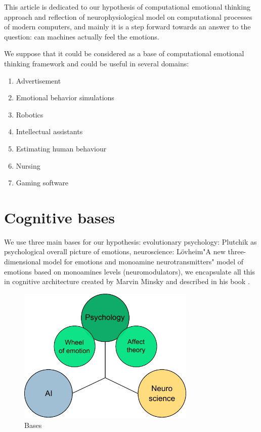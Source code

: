 This article is dedicated to our hypothesis of computational emotional thinking approach and reflection of neurophysiological model on computational processes of modern computers, and mainly it is a step forward towards an answer to the question: can machines actually feel the emotions.

We suppose that it could be considered as a base of computational emotional thinking framework and could be useful in several domains:

\begin{enumerate}
 \item  Advertisement
 \item  Emotional behavior simulations
 \item  Robotics
 \item  Intellectual assistants
 \item  Estimating human behaviour
 \item  Nursing
 \item  Gaming software
\end{enumerate}

\section{Cognitive bases}

We use three main bases for our hypothesis: evolutionary psychology: Plutchik \cite{natureofemotions} as psychological overall picture of emotions, neuroscience: L\"{o}vheim"A new three-dimensional model for emotions and monoamine neurotransmitters" \cite{cubeofemotions} model of emotions based on monoamines levels (neuromodulators), we encapsulate all this in cognitive architecture created by Marvin Minsky and described in his book \cite{emotionmachine}.

\begin{figure}
\begin{center}
 \includegraphics[height=6.5cm]{figure1_3_bases}
\end{center}
\caption{Bases}
\label{figure1_3_bases}
\end{figure}

